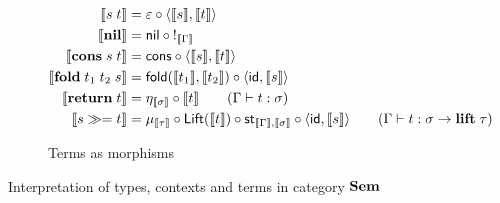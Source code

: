 \begin{figure}
\begin{subfigure}{0.8\linewidth}
\begin{align*}
  \sem{\tmApp{s}{t}} &= \eval \comp \prodM{\sem{s}}{\sem{t}}
  \\
  \sem{\tmNil} &= \nil \comp {!_{\sem{\Gamma}}}
  \\
  \sem{\tmCons{s}{t}} &= \cons \comp \prodM{\sem{s}}{\sem{t}}
  \\
  \sem{\tmFoldList{t_1}{t_2}{s}} &= \fold(\sem{t_1},\sem{t_2}) \comp \prodM{\id}{\sem{s}}
  \\
  \sem{\tmReturn{t}} &= \eta_{\sem{\sigma}} \comp \sem{t}
  \tag*{($\Gamma \vdash t: \sigma$)}
  \\
  \sem{\tmBind{s}{t}} &= \mu_{\sem{\tau}} \comp \Lift(\sem{t}) \comp \mathsf{st}_{\sem{\Gamma},\sem{\sigma}} \comp \prodM{\id}{\sem{s}}
  \tag*{($\Gamma \vdash t: \sigma \to \tyLift\;\tau$)}
  \end{align*}
  \caption{Terms as morphisms}
  \label{fig:semantics:terms}
\end{subfigure}
\caption{Interpretation of types, contexts and terms in category $\mathbf{Sem}$}
\end{figure}
